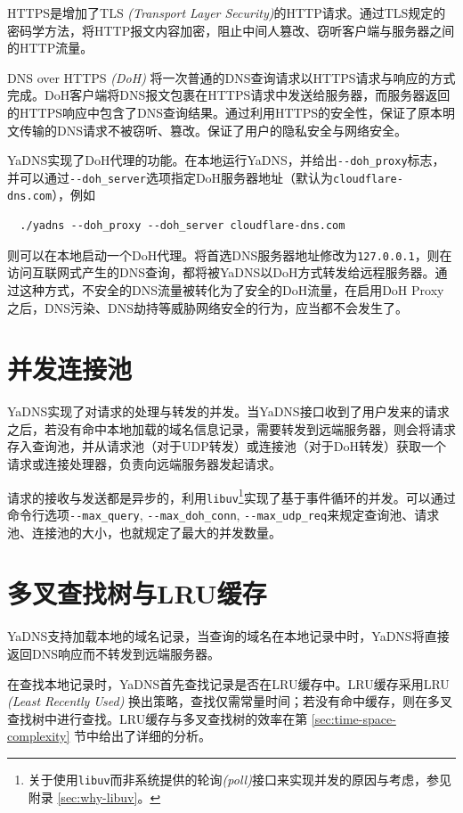 HTTPS是增加了TLS \emph{(Transport Layer Security)}的HTTP请求。通过TLS规定的密码学方法，将HTTP报文内容加密，阻止中间人篡改、窃听客户端与服务器之间的HTTP流量。

DNS over HTTPS \emph{(DoH)} 将一次普通的DNS查询请求以HTTPS请求与响应的方式完成。DoH客户端将DNS报文包裹在HTTPS请求中发送给服务器，而服务器返回的HTTPS响应中包含了DNS查询结果。通过利用HTTPS的安全性，保证了原本明文传输的DNS请求不被窃听、篡改。保证了用户的隐私安全与网络安全。

YaDNS实现了DoH代理的功能。在本地运行YaDNS，并给出\lstinline{--doh_proxy}标志，并可以通过\lstinline{--doh_server}选项指定DoH服务器地址（默认为\lstinline{cloudflare-dns.com}），例如
\begin{verbatim}
  ./yadns --doh_proxy --doh_server cloudflare-dns.com
\end{verbatim}
则可以在本地启动一个DoH代理。将首选DNS服务器地址修改为\lstinline{127.0.0.1}，则在访问互联网式产生的DNS查询，都将被YaDNS以DoH方式转发给远程服务器。通过这种方式，不安全的DNS流量被转化为了安全的DoH流量，在启用DoH Proxy之后，DNS污染、DNS劫持等威胁网络安全的行为，应当都不会发生了。

\section{并发连接池}

YaDNS实现了对请求的处理与转发的并发。当YaDNS接口收到了用户发来的请求之后，若没有命中本地加载的域名信息记录，需要转发到远端服务器，则会将请求存入查询池，并从请求池（对于UDP转发）或连接池（对于DoH转发）获取一个请求或连接处理器，负责向远端服务器发起请求。

请求的接收与发送都是异步的，利用\lstinline{libuv}\footnote{关于使用\lstinline{libuv}而非系统提供的轮询\emph{(poll)}接口来实现并发的原因与考虑，参见附录 \ref{sec:why-libuv}。}实现了基于事件循环的并发。可以通过命令行选项\lstinline{--max_query}, \lstinline{--max_doh_conn}, \lstinline{--max_udp_req}来规定查询池、请求池、连接池的大小，也就规定了最大的并发数量。

\section{多叉查找树与LRU缓存}

YaDNS支持加载本地的域名记录，当查询的域名在本地记录中时，YaDNS将直接返回DNS响应而不转发到远端服务器。

在查找本地记录时，YaDNS首先查找记录是否在LRU缓存中。LRU缓存采用LRU \emph{(Least Recently Used)} 换出策略，查找仅需常量时间；若没有命中缓存，则在多叉查找树中进行查找。LRU缓存与多叉查找树的效率在第 \ref{sec:time-space-complexity} 节中给出了详细的分析。

